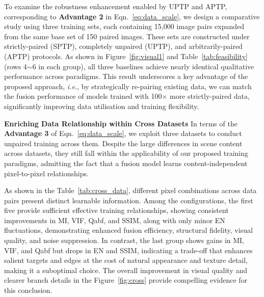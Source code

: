 To examine the robustness enhancement enabled by UPTP and APTP, corresponding to \textbf{Advantage 2} in Eqn.~\eqref{eq:data_scale}, we design a comparative study using three training sets, each containing 15,000 image pairs expanded from the same base set of 150 paired images. 
These sets are constructed under strictly-paired (SPTP), completely unpaired (UPTP), and arbitrarily-paired (APTP) protocols. 
As shown in Figure~\ref{fig:visual1} and Table~\ref{tab:feasibility} (rows 4$\sim$6 in each group), all three baselines achieve nearly identical qualitative performance across paradigms. 
This result underscores a key advantage of the proposed approach, \textit{i.e.}, by strategically re-pairing existing data, we can match the fusion performance of models trained with 100$\times$ more strictly-paired data, significantly improving data utilisation and training flexibility.


\noindent\textbf{Enriching Data Relationship within Cross Datasets}
In terms of the \textbf{Advantage 3} of Eqn.~\eqref{eq:data_scale}, we exploit three datasets to conduct unpaired training across them. 
Despite the large differences in scene content across datasets, they still fall within the applicability of our proposed training paradigms, admitting the fact that a fusion model learns content-independent pixel-to-pixel relationships. 

As shown in the Table~\ref{tab:cross_data}, different pixel combinations across data pairs present distinct learnable information. 
Among the configurations, the first five provide sufficient effective training relationships, showing consistent improvements in MI, VIF, Qabf, and SSIM, along with only minor EN fluctuations, demonstrating enhanced fusion efficiency, structural fidelity, visual quality, and noise suppression. 
In contrast, the last group shows gains in MI, VIF, and Qabf but drops in EN and SSIM, indicating a trade-off that enhances salient targets and edges at the cost of natural appearance and texture detail, making it a suboptimal choice. 
The overall improvement in visual quality and clearer branch details in the Figure~\ref{fig:cross} provide compelling evidence for this conclusion. 


